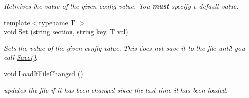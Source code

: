 \begin{DoxyCompactItemize}
\begin{DoxyCompactList}\small\item\em \-Retreives the value of the given config value. \-You {\bfseries must} specify a default value. \end{DoxyCompactList}\item 
\hypertarget{class_config_a5d9210c988409c7a95c1c9d0c293daa3}{
{\footnotesize template$<$typename T $>$ }\\void \hyperlink{class_config_a5d9210c988409c7a95c1c9d0c293daa3}{\-Set} (string section, string key, \-T val)}
\label{class_config_a5d9210c988409c7a95c1c9d0c293daa3}

\begin{DoxyCompactList}\small\item\em \-Sets the value of the given config value. \-This does not save it to the file until you call \hyperlink{class_config_ab04c51d227c1457404ae9dadc1c576e1}{\-Save()}. \end{DoxyCompactList}\item 
\hypertarget{class_config_abf94809be52a00ca26d982d10db3cfbc}{
void \hyperlink{class_config_abf94809be52a00ca26d982d10db3cfbc}{\-Load\-If\-File\-Changed} ()}
\label{class_config_abf94809be52a00ca26d982d10db3cfbc}

\begin{DoxyCompactList}\small\item\em updates the file if it has been changed since the last time it has been loaded. \end{DoxyCompactList}\end{DoxyCompactItemize}
